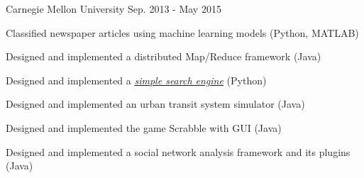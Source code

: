 

\begin{cventries}

  \cvsimpleentry
    {} %
    {Carnegie Mellon University} %
    {} %
    {Sep. 2013 - May 2015} %
     {
      \begin{cvitems} %
        \item {Classified newspaper articles using machine learning models (Python, MATLAB)}
        \item {Designed and implemented a distributed Map/Reduce framework (Java)}
        \item {Designed and implemented a \href{https://www.youtube.com/watch?v=WJ1t9i2Kdh4&feature=youtu.be}{\textit{simple search engine}} (Python)}
        \item {Designed and implemented an urban transit system simulator (Java)}
        \item {Designed and implemented the game Scrabble with GUI (Java)}
        \item {Designed and implemented a social network analysis framework and its plugins (Java)}
      \end{cvitems}
    }


\end{cventries}
